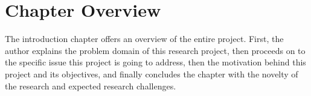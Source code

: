\section{Chapter Overview}

The introduction chapter offers an overview of the entire project. First, the author explains the problem domain of this research project, then proceeds on to the specific issue this project is going to address, then the motivation behind this project and its objectives, and finally concludes the chapter with the novelty of the research and expected research challenges.